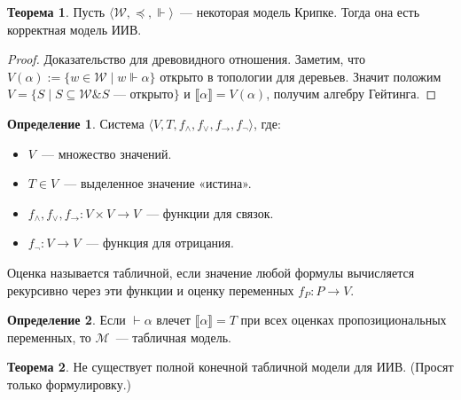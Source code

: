 \documentclass[a4paper,11pt]{article}
\theoremstyle{definition}
\newtheorem*{thm}{Теорема}
\newtheorem*{dfn}{Определение}
\newcommand{\proves}{\vdash}
\newcommand{\amp}{\mathbin{\&}}
\begin{document}
\begin{thm}
Пусть $\langle\mathcal{W}, \preceq, \Vdash\rangle$~--- некоторая модель Крипке.
Тогда она есть корректная модель ИИВ.
\end{thm}
\begin{proof}
Доказательство для древовидного отношения. Заметим, что $V(\alpha) := \{w \in
\mathcal{W} \mid w \Vdash \alpha\}$ открыто в топологии для деревьев. Значит
положим $V = \{S \mid S \subseteq \mathcal{W} \amp S \text{ --- открыто}\}$ и
$\llbracket\alpha\rrbracket = V(\alpha)$, получим алгебру Гейтинга.
\end{proof}

\begin{dfn}
Система $\langle V, T, f_\wedge, f_\vee, f_\to, f_\neg\rangle$, где:
\begin{itemize}
\item $V$~--- множество значений.
\item $T \in V$~--- выделенное значение «истина».
\item $f_\wedge, f_\vee, f_\to : V \times V \to V$~--- функции для связок.
\item $f_\neg : V \to V$~--- функция для отрицания.
\end{itemize}
Оценка называется табличной, если значение любой формулы вычисляется рекурсивно
через эти функции и оценку переменных $f_P : P \to V$.
\end{dfn}
\begin{dfn}
Если $\proves \alpha$ влечет $\llbracket\alpha\rrbracket = T$ при всех оценках
пропозициональных переменных, то $\mathcal{M}$~--- табличная модель.
\end{dfn}
\begin{thm}
Не существует полной конечной табличной модели для ИИВ. (Просят только
формулировку.)
\end{thm}
\end{document}
